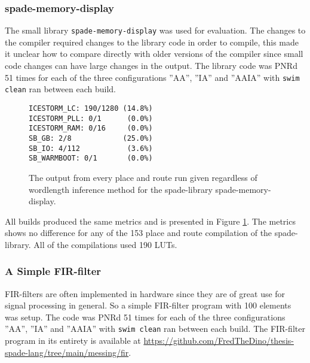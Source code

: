 \subsubsection{spade-memory-display}
The small library \verb+spade-memory-display+ was used for evaluation. The changes to the compiler required changes to the library code in order to compile, this made it unclear how to compare directly with older versions of the compiler since small code changes can have large changes in the output. The library code was PNRd 51 times for each of the three configurations ''AA'', ''IA'' and ''AAIA'' with \verb+swim clean+ ran between each build.
 
\begin{figure}
\begin{center}
\begin{verbatim}
ICESTORM_LC: 190/1280 (14.8%)
ICESTORM_PLL: 0/1      (0.0%)
ICESTORM_RAM: 0/16     (0.0%)
SB_GB: 2/8            (25.0%)
SB_IO: 4/112           (3.6%)
SB_WARMBOOT: 0/1       (0.0%)
\end{verbatim}
\end{center}

  \caption{The output from every place and route run given regardless of wordlength inference method for the spade-library spade-memory-display.}
  \label{fig:SMDoutput}
\end{figure}

All builds produced the same metrics and is presented in Figure \ref{fig:SMDoutput}. The metrics shows no difference for any of the 153 place and route compilation of the spade-library. All of the compilations used 190 LUTs. 

\subsubsection{A Simple FIR-filter}
FIR-filters are often implemented in hardware since they are of great use for signal processing in general. So a simple FIR-filter program with 100 elements was setup. The code was PNRd 51 times for each of the three configurations ''AA'', ''IA'' and ''AAIA'' with \verb+swim clean+ ran between each build. The FIR-filter program in its entirety is available at \href{https://github.com/FredTheDino/thesis-spade-lang/tree/main/messing/fir}{https://github.com/FredTheDino/thesis-spade-lang/tree/main/messing/fir}.

